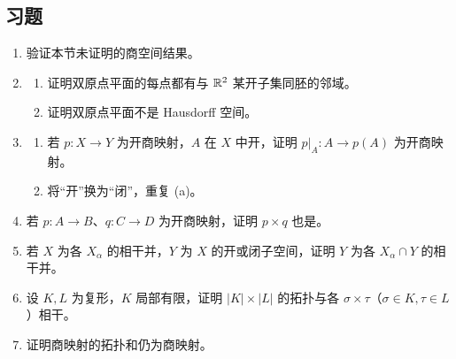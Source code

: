 \subsection*{习题}
\begin{enumerate}
\item 验证本节未证明的商空间结果。
\item \begin{enumerate}[label=(\alph*)]
\item 证明双原点平面的每点都有与 $\mathbb{R}^2$ 某开子集同胚的邻域。
\item 证明双原点平面不是 Hausdorff 空间。
\end{enumerate}
\item \begin{enumerate}[label=(\alph*)]
\item 若 $p:X\to Y$ 为开商映射，$A$ 在 $X$ 中开，证明 $p|_A:A\to p(A)$ 为开商映射。
\item 将“开”换为“闭”，重复 (a)。
\end{enumerate}
\item 若 $p:A\to B$、$q:C\to D$ 为开商映射，证明 $p\times q$ 也是。
\item 若 $X$ 为各 $X_\alpha$ 的相干并，$Y$ 为 $X$ 的开或闭子空间，证明 $Y$ 为各 $X_\alpha\cap Y$ 的相干并。
\item 设 $K,L$ 为复形，$K$ 局部有限，证明 $|K|\times|L|$ 的拓扑与各 $\sigma\times\tau$（$\sigma\in K,\tau\in L$）相干。
\item 证明商映射的拓扑和仍为商映射。
\end{enumerate}
